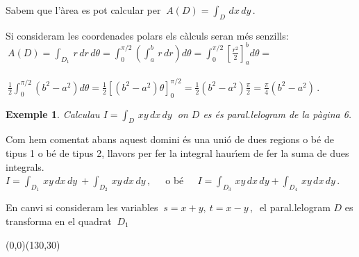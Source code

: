 \documentclass[12pt]{article}
\newtheorem{exemple}{Exemple}[subsection]
\begin{document}
\vspace*{1cm}

Sabem que l'{\`a}rea es pot calcular per $\ \displaystyle
A(D)=\int_D\,dx\,dy\,.$

Si consideram les coordenades polars els c{\`a}lculs seran m{\'e}s
senzills:\\

\hspace*{1cm}$\ \displaystyle
A(D)=\int_{D_1}\,r\,dr\,d\theta=\int_0^{\pi/2}\left(
\int_a^b\,r\,dr\right)d\theta=
\int_0^{\pi/2}\left[\frac{r^2}{2}\right]_a^b d\theta=$\\\\

\hspace*{1cm}$\
\displaystyle\frac{1}{2}\int_0^{\pi/2}(b^2-a^2)d\theta
=\frac{1}{2}\left[(b^2-a^2)\theta\right]_0^{\pi/2}=\frac{1}{2}(b^2-a^2)\frac{\pi}{2}
=\frac{\pi}{4}(b^2-a^2)\,.$\\

\begin{exemple}
Calculau  $I=\displaystyle\int_D\, xy\,dx\,dy\ $ on $D$ es {\'e}s
paral.lelogram de la p{\`a}gina 6.
\end{exemple}

Com hem comentat abans aquest domini {\'e}s una uni{\'o} de dues regions o
b{\'e} de tipus 1 o b{\'e} de tipus 2, llavors per fer la integral haur{\'\i}em
de fer la suma de dues integrals.\\

\hspace*{1cm} $I=\displaystyle\int_{D_1}\, xy\,dx\,dy\ +\int_{D_2}\,
xy\,dx\,dy\,,\ \ \ \ \ $ o b{\'e} $\ \ \ \ \ \displaystyle
I=\int_{D_3}\, xy\,dx\,dy+\int_{D_4}\, xy\,dx\,dy\,. $

\newpage
En canvi si consideram les variables $\ s=x+y,\ t=x-y\,,\ $ el
paral.lelogram $D$ es transforma en el quadrat $\ D_1\ $


\vspace*{1.5cm}
\begin{center}
\begin{picture}(0,0)(130,30)
\end{picture}
\end{center}
\end{document}

